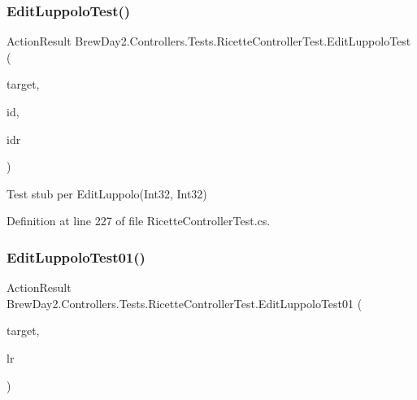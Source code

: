 \subsubsection{\texorpdfstring{Edit\+Luppolo\+Test()}{EditLuppoloTest()}}
{\footnotesize\ttfamily Action\+Result Brew\+Day2.\+Controllers.\+Tests.\+Ricette\+Controller\+Test.\+Edit\+Luppolo\+Test (\begin{DoxyParamCaption}\item[{\mbox{[}\+Pex\+Assume\+Under\+Test\mbox{]} \mbox{\hyperlink{class_brew_day2_1_1_controllers_1_1_ricette_controller}{Ricette\+Controller}}}]{target,  }\item[{int}]{id,  }\item[{int}]{idr }\end{DoxyParamCaption})}



Test stub per Edit\+Luppolo(\+Int32, Int32)



Definition at line 227 of file Ricette\+Controller\+Test.\+cs.

\mbox{\label{class_brew_day2_1_1_controllers_1_1_tests_1_1_ricette_controller_test_a2d3b276eacf5a6cea4dd35e480193f70}} 
\subsubsection{\texorpdfstring{Edit\+Luppolo\+Test01()}{EditLuppoloTest01()}}
{\footnotesize\ttfamily Action\+Result Brew\+Day2.\+Controllers.\+Tests.\+Ricette\+Controller\+Test.\+Edit\+Luppolo\+Test01 (\begin{DoxyParamCaption}\item[{\mbox{[}\+Pex\+Assume\+Under\+Test\mbox{]} \mbox{\hyperlink{class_brew_day2_1_1_controllers_1_1_ricette_controller}{Ricette\+Controller}}}]{target,  }\item[{\mbox{\hyperlink{class_brew_day2_1_1_models_1_1_luppoli_ricetta}{Luppoli\+Ricetta}}}]{lr }\end{DoxyParamCaption})}



